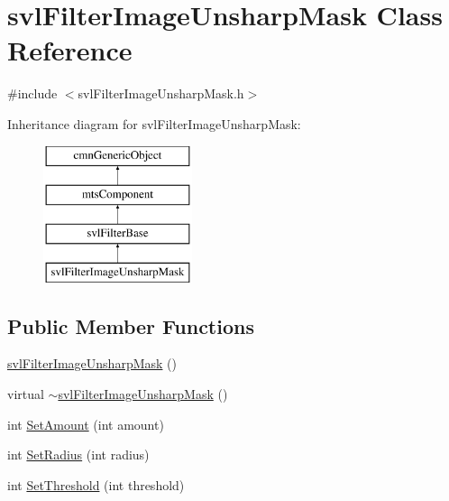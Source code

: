 \hypertarget{classsvl_filter_image_unsharp_mask}{}\section{svl\+Filter\+Image\+Unsharp\+Mask Class Reference}
\label{classsvl_filter_image_unsharp_mask}


{\ttfamily \#include $<$svl\+Filter\+Image\+Unsharp\+Mask.\+h$>$}

Inheritance diagram for svl\+Filter\+Image\+Unsharp\+Mask\+:\begin{figure}[H]
\begin{center}
\leavevmode
\includegraphics[height=4.000000cm]{d4/d5e/classsvl_filter_image_unsharp_mask}
\end{center}
\end{figure}
\subsection*{Public Member Functions}
\begin{DoxyCompactItemize}
\item 
\hyperlink{classsvl_filter_image_unsharp_mask_a835a6b38cfbcb921532bff0bea061745}{svl\+Filter\+Image\+Unsharp\+Mask} ()
\item 
virtual \hyperlink{classsvl_filter_image_unsharp_mask_a9ffa23cfea44697712fbec7589e297cd}{$\sim$svl\+Filter\+Image\+Unsharp\+Mask} ()
\item 
int \hyperlink{classsvl_filter_image_unsharp_mask_a66c0f04c3711fdbae743fbe2a2d801cd}{Set\+Amount} (int amount)
\item 
int \hyperlink{classsvl_filter_image_unsharp_mask_af66f23e95bc343f9a7a03b7a7c5a5a95}{Set\+Radius} (int radius)
\item 
int \hyperlink{classsvl_filter_image_unsharp_mask_a87ec07638b714506a45acc97c05aa885}{Set\+Threshold} (int threshold)
\end{DoxyCompactItemize}
